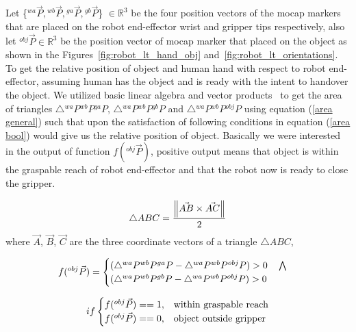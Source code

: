 Let \{${}^{wa}\vec P, {}^{wb}\vec P, {}^{ga}\vec P, {}^{gb}\vec P$\} $\in \mathbb{R}^{3}$ be the four position vectors of the mocap markers that are placed on the robot end-effector wrist and gripper tips respectively, also let ${}^{obj}\vec P\in \mathbb{R}^{3}$ be the position vector of mocap marker that placed on the object as shown in the Figures~\ref{fig:robot_lt_hand_obj} and~\ref{fig:robot_lt_orientations}. To get the relative position of object and human hand with respect to robot end-effector, assuming human has the object and is ready with the intent to handover the object. We utilized basic linear algebra and vector products~\cite{brand1947vector, crowe1994history, artin2016geometric} to get the area of triangles $\triangle{{}^{wa}P {}^{wb}P {}^{ga}P}$, $\triangle{{}^{wa}P {}^{wb}P {}^{gb}P}$ and $\triangle{{}^{wa}P {}^{wb}P {}^{obj}P}$ using equation (\ref{area general}) such that upon the satisfaction of following conditions in equation (\ref{area bool}) would give us the relative position of object. Basically we were interested in the output of function $f({}^{obj}\vec{P})$, positive output means that object is within the graspable reach of robot end-effector and that the robot now is ready to close the gripper.


\begin{equation}\label{area general}
        \triangle{ABC} = \frac{\norm{ \vec{AB} \times \vec{AC} }} {2} \\
\end{equation}
where $\vec{A}$, $\vec{B}$, $\vec{C}$ are the three coordinate vectors of a triangle $\triangle{ABC}$,


\begin{equation}\label{area}
    \centering
    f({}^{obj}\vec{P}) = 
    \begin{cases}
     (\triangle{{}^{wa}P {}^{wb}P {}^{ga}P} - \triangle{{}^{wa}P {}^{wb}P {}^{obj}P}) > 0 \quad \bigwedge \\
     (\triangle{{}^{wa}P {}^{wb}P {}^{gb}P} - \triangle{{}^{wa}P {}^{wb}P {}^{obj}P}) > 0
   \end{cases}         
\end{equation}

\begin{equation}\label{area bool}
    \centering
    if
    \begin{cases}
     f({}^{obj}\vec{P})==1, & \text{within graspable reach}  \\
     f({}^{obj}\vec{P})==0, & \text{object outside gripper}
   \end{cases}         
\end{equation}





